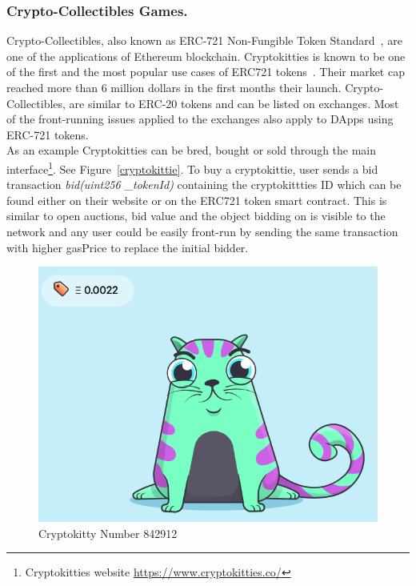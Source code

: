 


\subsubsection{Crypto-Collectibles Games.}

Crypto-Collectibles, also known as ERC-721 Non-Fungible Token Standard~\cite{erc721}, are one of the applications of Ethereum blockchain. Cryptokitties is known to be one of the first and the most popular use cases of ERC721 tokens~\cite{cryptokitties}. Their market cap reached more than 6 million dollars in the first months their launch. Crypto-Collectibles, are similar to ERC-20 tokens and can be listed on exchanges. Most of the front-running issues applied to the exchanges also apply to DApps using ERC-721 tokens. \\

As an example Cryptokitties can be bred, bought or sold through the main interface\footnote{Cryptokitties website \url{https://www.cryptokitties.co/}}. See Figure~\ref{cryptokittie}.
To buy a cryptokittie, user sends a bid transaction \textit{bid(uint256 \_tokenId)} containing the cryptokittties ID which can be found either on their website or on the ERC721 token smart contract. This is similar to open auctions, bid value and the object bidding on is visible to the network and any user could be easily front-run by sending the same transaction with higher gasPrice to replace the initial bidder. 


\begin{figure}[h]
\centering
\includegraphics[width=0.4\linewidth]{figures/cryptokittie842912.png}
\caption{ Cryptokitty Number 842912 \label{fig:cryptokittie}}
\end{figure}


